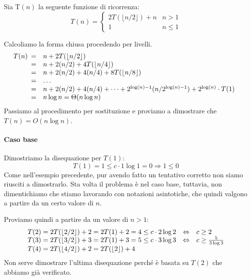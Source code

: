 \begin{eg}
    Sia T$(n)$ la seguente funzione di ricorrenza:
    \[T(n)=\begin{cases}
        2T(\lfloor n/2\rfloor)+n & n>1\\
        1 & n\leq1
    \end{cases}\]

    \bigskip\noindent
    Calcoliamo la forma chiusa procedendo per livelli.
    \[T(n)\begin{array}[t]{cl}
        = & n+2T(\lfloor n/2\rfloor)\\
        = & n+2(n/2)+4T(\lfloor n/4\rfloor)\\
        = & n+2(n/2)+4(n/4)+8T(\lfloor n/8\rfloor)\\
        = & \dots\\
        = & n+2(n/2)+4(n/4)+\dots+2^{\log(n)-1}(n/2^{\log(n)-1})+2^{\log(n)}\cdot T(1)\\
        = & n\log n=\Theta(n\log n)
    \end{array}\]
    Passiamo al procedimento per sostituzione e proviamo a dimostrare che
    $T(n)=O(n\log n)$.

    \paragraph{Caso base} Dimostriamo la disequazione per $T(1)$:
    \[T(1)=1\leq c\cdot1\log1=0\Rightarrow 1\leq0\]
    Come nell'esempio precedente, pur avendo fatto un tentativo corretto non siamo
    riusciti a dimostrarlo. Sta volta il problema è nel caso base, tuttavia, non
    dimentichiamo che stiamo lavorando con notazioni asintotiche, che quindi
    valgono a partire da un certo valore di $n$.
    
    Proviamo quindi a partire da un valore di $n>1$:
    \[\begin{array}[t]{lcl}
        T(2)=2T(\lfloor 2/2\rfloor)+2=2T(1)+2=4\leq c\cdot2\log2 & \Leftrightarrow &c\geq2\\
        T(3)=2T(\lfloor 3/2\rfloor)+3=2T(1)+3=5\leq c\cdot3\log3 & \Leftrightarrow & c\geq\frac{5}{3\log3}\\
        T(4)=2T(\lfloor 4/2\rfloor)+2=2T(\lfloor 2\rfloor)+4
    \end{array}\]
    Non serve dimostrare l'ultima disequazione perché è basata su $T(2)$ che
    abbiamo già verificato.


\end{eg}
